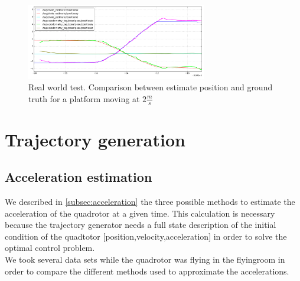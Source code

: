 \begin{figure}[!ht]
    \centering
    \includegraphics[width=0.7\textwidth]{img/position_real_world_fast.png}
      \caption{Real world test. Comparison between estimate position and ground truth for a platform moving at $2\frac{m}{s}$}
    \label{fig:ekf_position_real_fast}
\end{figure}

\newpage

\section{Trajectory generation}

\subsection{Acceleration estimation} \label{subsec:acceleration_experiments}
We described in \ref{subsec:acceleration} the three possible methods to estimate the acceleration of the quadrotor at a given time. This calculation is necessary because the trajectory generator needs a full state description of the initial condition of the quadtotor [position,velocity,acceleration] in order to solve the optimal control problem.\\
We took several data sets while the quadrotor was flying in the flyingroom in order to compare the different methods used to approximate the accelerations.\\

